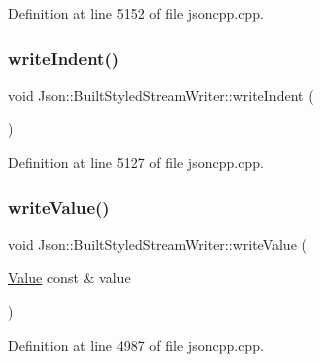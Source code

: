 Definition at line 5152 of file jsoncpp.\+cpp.

\hypertarget{struct_json_1_1_built_styled_stream_writer_a2b38a3714d415c4bd3b4812897130f3d}{}\label{struct_json_1_1_built_styled_stream_writer_a2b38a3714d415c4bd3b4812897130f3d} 
\subsubsection{\texorpdfstring{write\+Indent()}{writeIndent()}}
{\footnotesize\ttfamily void Json\+::\+Built\+Styled\+Stream\+Writer\+::write\+Indent (\begin{DoxyParamCaption}{ }\end{DoxyParamCaption})\hspace{0.3cm}{\ttfamily [private]}}



Definition at line 5127 of file jsoncpp.\+cpp.

\hypertarget{struct_json_1_1_built_styled_stream_writer_a7c9da861861e570a51b45f270c9ff150}{}\label{struct_json_1_1_built_styled_stream_writer_a7c9da861861e570a51b45f270c9ff150} 
\subsubsection{\texorpdfstring{write\+Value()}{writeValue()}}
{\footnotesize\ttfamily void Json\+::\+Built\+Styled\+Stream\+Writer\+::write\+Value (\begin{DoxyParamCaption}\item[{\hyperlink{class_json_1_1_value}{Value} const \&}]{value }\end{DoxyParamCaption})\hspace{0.3cm}{\ttfamily [private]}}



Definition at line 4987 of file jsoncpp.\+cpp.

\hypertarget{struct_json_1_1_built_styled_stream_writer_a6e80e1a0d5f64df2ec48c3c3b1284990}{}\label{struct_json_1_1_built_styled_stream_writer_a6e80e1a0d5f64df2ec48c3c3b1284990} 
